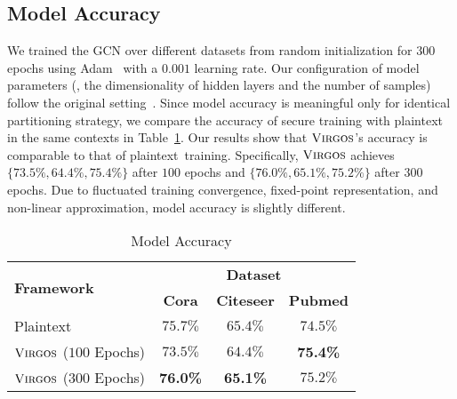 \subsection{Model Accuracy}
\label{sec::acc_compare_gcn}
We trained the GCN over different datasets from random initialization for $300$ epochs using Adam~\cite{iclr/KingmaB14} with a $0.001$ learning rate.
Our configuration of model parameters (\ie, the dimensionality of hidden layers and the number of samples) follow the original setting~\cite{iclr/KipfW17}.
Since model accuracy is meaningful only for identical partitioning strategy, we compare the accuracy of secure training with plaintext in the same contexts in Table~\ref{tab:acc_inf_tra}.
Our results show that $\textnormal{\textsc{Virgos}}$'s accuracy is comparable to that of plaintext~training.
Specifically, $\textnormal{\textsc{Virgos}}$ achieves $\{73.5\%, 64.4\%, 75.4\%\}$ after $100$ epochs and $\{76.0\%, 65.1\%, 75.2\%\}$ after $300$ epochs.
Due to fluctuated training convergence, fixed-point representation, and non-linear approximation, model accuracy is slightly different.

 
\begin{table}[!t]
 	\centering
 	\caption{Model Accuracy}
 	\label{tab:acc_inf_tra}
 	\setlength\tabcolsep{7pt}
 	\begin{tabular}{l|ccc}
	\hline
 	\multirow{2}{*}{\textbf{Framework}} & \multicolumn{3}{c}{\textbf{Dataset}}
	\\\cline{2-4}
 & \textbf{Cora} &\textbf{Citeseer} & \textbf{Pubmed}\! \\
 	 	\hline
	{Plaintext}
	& $75.7\%$ 	 & $65.4\%$ & $74.5\%$\! \\
 	\rowcolor{grayL}$\textnormal{\textsc{Virgos}}$ ($100$ Epochs)\! & $73.5\%$ & $64.4\%$ & \textbf{75.4\%}\! \\
 	\rowcolor{grayL}$\textnormal{\textsc{Virgos}}$ ($300$ Epochs)\! & \textbf{76.0\%} & \textbf{65.1\%} & $75.2\%$\! \\
 	 	\hline
 	 	\end{tabular}
 	\iffalse
 	\begin{tablenotes}
 	\item {The results of ``plaintext'' are from running dgl at {\url{https://github.com/dmlc/dgl}}.
 	The results of ``SecGNN'' are from running the code at \url{https://github.com/songleiW/SecGNN.git}.
 	}
 	\end{tablenotes}
 	\fi
\end{table}

